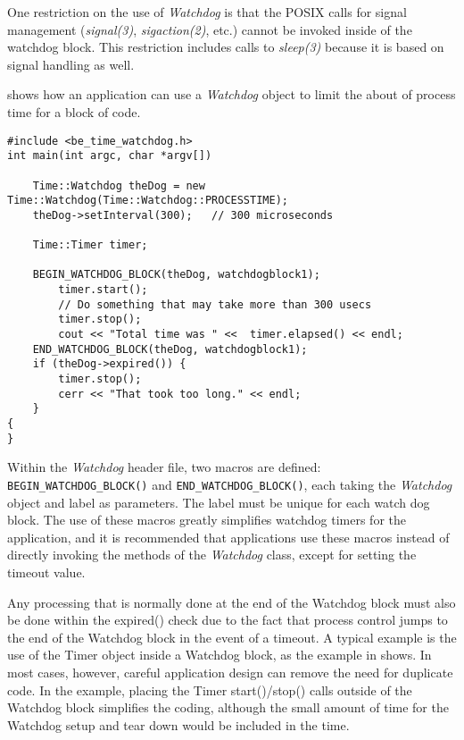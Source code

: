 One restriction on the use of {\em Watchdog} is that the POSIX calls for
signal management ({\em signal(3)}, {\em sigaction(2)}, etc.) cannot be
invoked inside of the watchdog block. This restriction includes calls to
{\em sleep(3)} because it is based on signal handling as well.

 shows how an application can use a {\em Watchdog}
object to limit the about of process time for a block of code.

\lstset{language=c++}
\begin{lstlisting}[caption={Using the Watchdog}, label=watchdoguse]
#include <be_time_watchdog.h>
int main(int argc, char *argv[])

    Time::Watchdog theDog = new Time::Watchdog(Time::Watchdog::PROCESSTIME);
    theDog->setInterval(300);	// 300 microseconds

    Time::Timer timer;

    BEGIN_WATCHDOG_BLOCK(theDog, watchdogblock1);
        timer.start();
        // Do something that may take more than 300 usecs
        timer.stop();
        cout << "Total time was " <<  timer.elapsed() << endl;
    END_WATCHDOG_BLOCK(theDog, watchdogblock1);
    if (theDog->expired()) {
        timer.stop();
        cerr << "That took too long." << endl;
    }
{
}
\end{lstlisting}

Within the {\em Watchdog} header file, two macros are defined:
{\tt BEGIN\_WATCHDOG\_BLOCK()} and {\tt END\_WATCHDOG\_BLOCK()}, each taking
the {\em Watchdog} object and label as parameters. The label must be unique
for each watch dog block.  The use of these macros greatly simplifies
watchdog timers for the application, and it is recommended that applications
use these macros instead of directly invoking the methods of the
{\em Watchdog} class, except for setting the timeout value.

Any processing that is normally done at the end of the Watchdog block must also
be done within the expired() check
due to the fact that process control jumps to the end of the Watchdog block
in the event of a timeout.
A typical example is the use of the Timer
object inside a Watchdog block, as the example in 
shows. In most cases, however, careful application design can remove the need
for duplicate code. In the example, placing the Timer start()/stop() calls
outside of the Watchdog block simplifies the coding, although the small amount
of time for the Watchdog setup and tear down would be included in the time.
